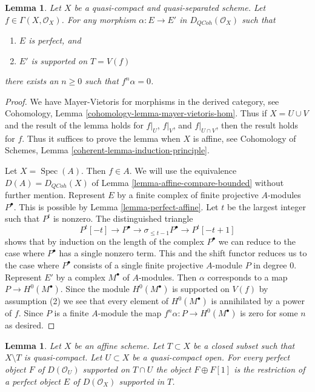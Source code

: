 \documentclass{stacks-project}
\theoremstyle{plain}
\newtheorem{lemma}[subsection]{Lemma}
\theoremstyle{definition}
\theoremstyle{remark}
\numberwithin{equation}{subsection}
\def\Spec{\mathop{\mathrm{Spec}}}
\def\QCoh{\mathit{QCoh}}
\begin{document}
\begin{lemma}
\label{lemma-perfect-into-support-on-T}
Let $X$ be a quasi-compact and quasi-separated scheme.
Let $f \in \Gamma(X, \mathcal{O}_X)$.
For any morphism $\alpha : E \to E'$ in
$D_\QCoh(\mathcal{O}_X)$ such that
\begin{enumerate}
\item $E$ is perfect, and
\item $E'$ is supported on $T = V(f)$
\end{enumerate}
there exists an $n \geq 0$ such that $f^n \alpha  = 0$.
\end{lemma}

\begin{proof}
We have Mayer-Vietoris for morphisms in the derived category, see
Cohomology, Lemma \ref{cohomology-lemma-mayer-vietoris-hom}.
Thus if $X = U \cup V$ and the result of the lemma holds
for $f|_U$, $f|_V$, and $f|_{U \cap V}$, then the result holds for $f$.
Thus it suffices to prove the lemma when $X$ is affine, see
Cohomology of Schemes, Lemma \ref{coherent-lemma-induction-principle}.

\medskip\noindent
Let $X = \Spec(A)$. Then $f \in A$. We will
use the equivalence $D(A) = D_\QCoh(X)$ of
Lemma \ref{lemma-affine-compare-bounded}
without further mention.
Represent $E$ by a finite complex of finite projective $A$-modules
$P^\bullet$. This is possible by Lemma \ref{lemma-perfect-affine}.
Let $t$ be the largest integer such that $P^t$ is nonzero.
The distinguished triangle
$$
P^t[-t] \to P^\bullet \to \sigma_{\leq t - 1}P^\bullet \to P^t[-t + 1]
$$
shows that by induction on the length of the complex $P^\bullet$
we can reduce to the case where $P^\bullet$ has a single nonzero term.
This and the shift functor reduces us to the case where $P^\bullet$
consists of a single finite projective $A$-module $P$ in degree $0$.
Represent $E'$ by a complex $M^\bullet$ of $A$-modules.
Then $\alpha$ corresponds to a map $P \to H^0(M^\bullet)$.
Since the module $H^0(M^\bullet)$ is supported on $V(f)$ by assumption (2)
we see that every element of $H^0(M^\bullet)$ is annihilated by a power
of $f$. Since $P$ is a finite $A$-module the map
$f^n\alpha : P \to H^0(M^\bullet)$ is zero for some $n$ as desired.
\end{proof}

\begin{lemma}
\label{lemma-lift-perfect-complex-plus-shift-support}
Let $X$ be an affine scheme. Let $T \subset X$ be a closed subset
such that $X \setminus T$ is quasi-compact. Let $U \subset X$ be a
quasi-compact open. For every perfect object $F$ of $D(\mathcal{O}_U)$
supported on $T \cap U$ the object $F \oplus F[1]$ is the restriction of
a perfect object $E$ of $D(\mathcal{O}_X)$ supported in $T$.
\end{lemma}
\end{document}
